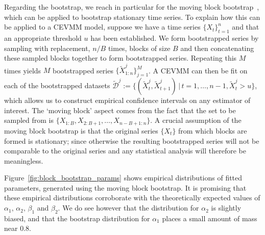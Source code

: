 \documentclass[11pt,twoside,openany]{book}
\newcommand{\D}{\mathcal{D}}
\numberwithin{Theorem}{chapter}
\numberwithin{Definition}{chapter}
\numberwithin{Lemma}{chapter}
\numberwithin{Algorithm}{chapter}
\numberwithin{equation}{chapter}
\begin{document}
Regarding the bootstrap, we reach in particular for the moving block
bootstrap~\citep{kunsch1989jackknife}, which can be applied to bootstrap stationary time series.
To explain how this can be applied to a CEVMM model,
suppose we have a time series $\{X_t\}_{t=1}^n$ and
that an appropriate threshold $u$ has been established. We form bootstrapped
series by sampling with replacement, $n/B$ times, blocks of size $B$ and then
concatenating these sampled blocks together to form bootstrapped series.
Repeating this $M$ times yields $M$ bootstrapped series
$\{\tilde{X}^j_{1:n}\}_{j=1}^M$.
A CEVMM can then be fit on each of the bootstrapped datasets
$\tilde{\D}^j := \{(\tilde{X}^j_{t},\tilde{X}^j_{t+1})\,|\,t=1,\ldots,n-1,\tilde{X}^j_{t}>u\}$,
which allows us to construct empirical confidence intervals on any estimator
of interest.
The `moving block' aspect
comes from the fact that the set to be sampled from is $\{X_{1:B},X_{2:B+1},\ldots,X_{n-B+1:n}\}$.
A crucial assumption of the moving block bootstrap is that the original series $\{X_t\}$ from
which blocks are formed is stationary; since otherwise the resulting bootstrapped
series will not be comparable to the original series and any statistical analysis
will therefore be meaningless.




\FloatBarrier
Figure~\ref{fig:block_bootstrap_params} shows empirical distributions of fitted
parameters, generated using the moving
block bootstrap. It is promising that these empirical distributions corroborate
with the theoretically expected values of $\alpha_1,\,\alpha_2,\,\beta_1$ and
$\beta_2$. We do see however that the distribution for $\alpha_2$ is slightly biased,
and that the bootstrap distribution for $\alpha_1$ places a small amount of mass near $0.8$.
\end{document}
